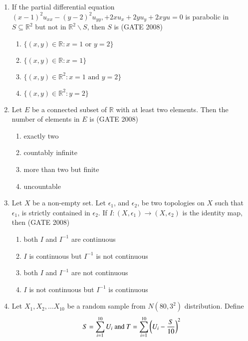 \documentclass[journal]{IEEEtran}
\begin{document}
\begin{enumerate}
\item{ If the partial differential equation $(x-1)^2 u_{xx}-(y-2)^2u_{yy}, +2xu_x + 2yu_y +2xyu=0$ is parabolic in $S \subseteq \mathbb{R}^2$ but not in $\mathbb{R}^2\backslash S$, then $S$ is \hfill (GATE 2008)
\begin{multicols}{2}
    \begin{enumerate}
        \item $\{(x, y) \in \mathbb{R}:x=1 \text{ or } y=2\}$
        \item $\{(x,y) \in \mathbb{R}:x=1\}$
        \item $\{(x, y) \in \mathbb{R}^2:x=1 \text{ and } y = 2\}$
        \item $\{(x, y) \in \mathbb{R}^2: y=2\}$
    \end{enumerate}
\end{multicols}




}

\item{ Let $E$ be a connected subset of $\mathbb{R}$ with at least two elements. Then the number of elements in $E$ is \hfill (GATE 2008)
\begin{multicols}{2}
    \begin{enumerate}
        \item exactly two
        \item countably infinite
        \item more than two but finite 
        \item uncountable
    \end{enumerate}
\end{multicols}
}

\item{ Let $X$ be a non-empty set. Let $\epsilon_1$, and $\epsilon_2$, be two topologies on $X$ such that $\epsilon_1$, is strictly contained in $\epsilon_2$. If $I: (X,\epsilon_1)\rightarrow (X,\epsilon_2)$ is the identity map, then \hfill (GATE 2008)
    \begin{enumerate}
        \item both $I$ and $I^{-1}$ are continuous
        \item $I$ is continuous but $I^{-1}$ is not continuous
        \item both $I$ and $I^{-1}$ are not continuous
        \item $I$ is not continuous but $I^{-1}$ is continuous
    \end{enumerate}
}

\item{ Let $X_1, X_2, \ldots X_{10}$ be a random sample from $N(80,3^2)$ distribution. Define 
$$S=\sum_{i=1}^{10}U_i \text{ and } T=\sum_{i=1}^{10}\left(U_i - \frac{S}{10}\right)^2$$

}
\end{enumerate}
\end{document}
